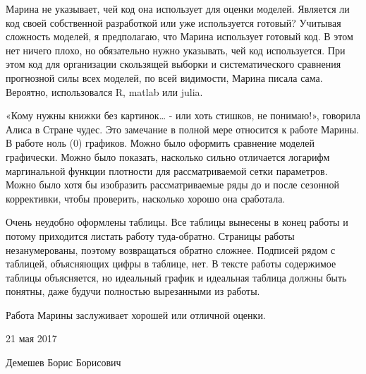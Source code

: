 \documentclass[a4paper, 12pt]{article}
\begin{document}
Марина не указывает, чей код она использует для оценки моделей. Является
ли код своей собственной разработкой или уже используется готовый?
Учитывая сложность моделей, я предполагаю, что Марина использует готовый
код. В этом нет ничего плохо, но обязательно нужно указывать, чей код
используется. При этом код для организации скользящей выборки и
систематического сравнения прогнозной силы всех моделей, по всей
видимости, Марина писала сама. Вероятно, использовался R, matlab или
julia.

«Кому нужны книжки без картинок\ldots{} - или хоть стишков, не
понимаю!», говорила Алиса в Стране чудес. Это замечание в полной мере
относится к работе Марины. В работе ноль (0) графиков. Можно было
оформить сравнение моделей графически. Можно было показать, насколько
сильно отличается логарифм маргинальной функции плотности для
рассматриваемой сетки параметров. Можно было хотя бы изобразить
рассматриваемые ряды до и после сезонной коррективки, чтобы проверить,
насколько хорошо она сработала.

Очень неудобно оформлены таблицы. Все таблицы вынесены в конец работы и
потому приходится листать работу туда-обратно. Страницы работы
незанумерованы, поэтому возвращаться обратно сложнее. Подписей рядом с
таблицей, объясняющих цифры в таблице, нет. В тексте работы содержимое
таблицы объясняется, но идеальный график и идеальная таблица должны быть
понятны, даже будучи полностью вырезанными из работы.

Работа Марины заслуживает хорошей или отличной оценки.

\vspace{0.4cm}

21 мая 2017

Демешев Борис Борисович
\end{document}
